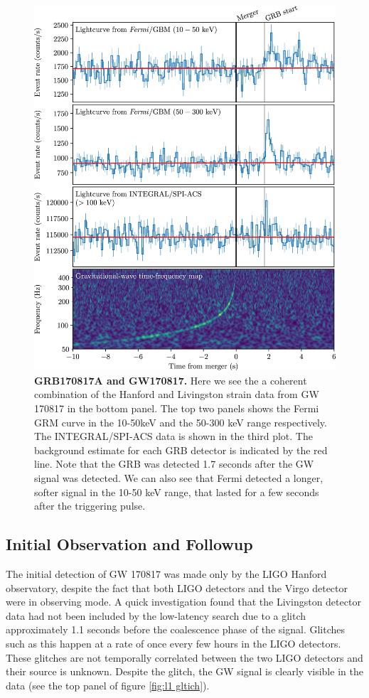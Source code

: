 \documentclass[11pt]{cuthesis}
\begin{document}
\begin{figure} %
\begin{center}
\includegraphics[width=0.8\linewidth]{grb-gw-170817.jpg}
\end{center}
\caption{\textbf{GRB170817A and GW170817.} Here we see the a coherent combination of the Hanford and Livingston strain data from GW 170817 in the bottom panel. The top two panels shows the Fermi GRM curve in the 10-50keV and the 50-300 keV range respectively. The INTEGRAL/SPI-ACS data is shown in the third plot. The background estimate for each GRB detector is indicated by the red line. Note that the GRB was detected 1.7 seconds after the GW signal was detected. We can also see that Fermi detected a longer, softer signal in the 10-50 keV range, that lasted for a few seconds after the triggering pulse. \cite{GW170817_GRB} }
\label{fig:grb gw 170817}
\end{figure}

\subsection{Initial Observation and Followup}
The initial detection of GW 170817 was made only by the LIGO Hanford observatory, despite the fact that both LIGO detectors and the Virgo detector were in observing mode. A quick investigation found that the Livingston detector data had not been included by the low-latency search due to a glitch approximately 1.1 seconds before the coalescence phase of the signal\cite{GW170817_det}. Glitches such as this happen at a rate of once every few hours in the LIGO detectors. These glitches are not temporally correlated between the two LIGO detectors and their source is unknown. Despite the glitch, the GW signal is clearly visible in the data (see the top panel of figure \ref{fig:l1 gltich}). 
\end{document}
